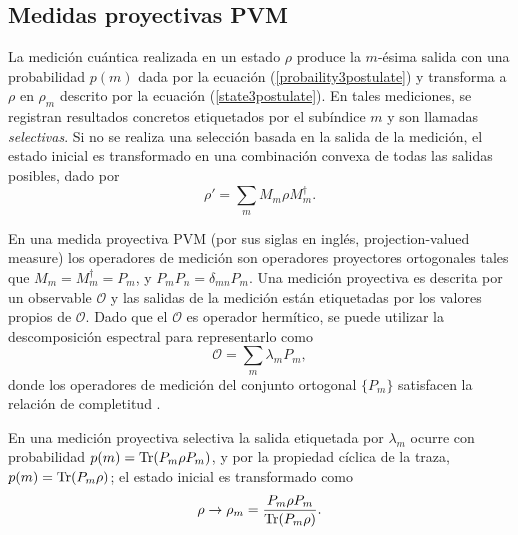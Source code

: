 \subsection{Medidas proyectivas PVM}\label{subsec:Cap1:medidasproyectivasPVM} %
La medición cuántica realizada en un estado $\rho$ produce  la $m$-ésima 
salida con una probabilidad $p(m)$ dada por la ecuación
(\ref{probaility3postulate}) y transforma a $\rho $ en $\rho_m$ descrito por la
ecuación (\ref{state3postulate}). En tales mediciones, se registran resultados
concretos etiquetados por el subíndice $m$ y son llamadas \textit{selectivas}.
Si no se realiza una selección basada en la salida de la medición, el estado
inicial es transformado en una combinación convexa de todas las salidas
posibles, dado por 
\begin{equation}\label{eq: non-selective-measure}
	\rho'=\sum_m M_m\rho M_m^\dagger.
\end{equation}


En una medida proyectiva PVM (por sus siglas en inglés, projection-valued
measure) los operadores de medición son operadores proyectores ortogonales
tales que $M_{m}=M_{m}^{\dagger}=P_{m}$, y $P_{m}P_{n}=\delta_{mn}P_{m}$. Una
medición proyectiva es descrita por un observable $\mathcal{O}$ y las salidas
de la medición están etiquetadas por los valores propios de $\mathcal{O}$. Dado
que el $\mathcal{O}$ es operador hermítico, se puede utilizar la descomposición
espectral para representarlo como \begin{equation}
	\mathcal{O}=\sum_m \lambda_m P_m,
\end{equation} donde los operadores de medición del conjunto ortogonal $\{P_m\}$ satisfacen la relación de completitud {\cite{2007geometry}}. 

En una medición proyectiva selectiva la salida etiquetada por $\lambda_m$
ocurre con probabilidad $p(m)={\rm Tr}(P_m\rho P_m)$, y por la propiedad cíclica de
la traza,  $p(m)={\rm Tr}(P_m\rho)$; el estado inicial es transformado como 
\begin{equation}\label{stateProjective}
	\rho\to	\rho_m=\dfrac{P_m\rho P_m}{{\rm Tr}(P_m \rho)}.
\end{equation}

